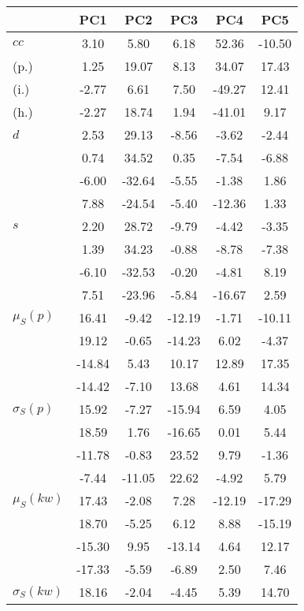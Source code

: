 \begin{table}[h!]
\begin{center}
\begin{tabular}{| l | c | c | c | c | c |}\hline
 & PC1 & PC2 & PC3 & PC4 & PC5 \\\hline
$cc$ & 3.10  & 5.80  & 6.18  & 52.36  & -10.50 \\\hline
(p.) & 1.25  & 19.07  & 8.13  & 34.07  & 17.43 \\\hline
(i.) & -2.77  & 6.61  & 7.50  & -49.27  & 12.41 \\\hline
(h.) & -2.27  & 18.74  & 1.94  & -41.01  & 9.17 \\\hline
$d$ & 2.53  & 29.13  & -8.56  & -3.62  & -2.44 \\\hline
 & 0.74  & 34.52  & 0.35  & -7.54  & -6.88 \\\hline
 & -6.00  & -32.64  & -5.55  & -1.38  & 1.86 \\\hline
 & 7.88  & -24.54  & -5.40  & -12.36  & 1.33 \\\hline
$s$ & 2.20  & 28.72  & -9.79  & -4.42  & -3.35 \\\hline
 & 1.39  & 34.23  & -0.88  & -8.78  & -7.38 \\\hline
 & -6.10  & -32.53  & -0.20  & -4.81  & 8.19 \\\hline
 & 7.51  & -23.96  & -5.84  & -16.67  & 2.59 \\\hline
$\mu_S(p)$ & 16.41  & -9.42  & -12.19  & -1.71  & -10.11 \\\hline
 & 19.12  & -0.65  & -14.23  & 6.02  & -4.37 \\\hline
 & -14.84  & 5.43  & 10.17  & 12.89  & 17.35 \\\hline
 & -14.42  & -7.10  & 13.68  & 4.61  & 14.34 \\\hline
$\sigma_S(p)$ & 15.92  & -7.27  & -15.94  & 6.59  & 4.05 \\\hline
 & 18.59  & 1.76  & -16.65  & 0.01  & 5.44 \\\hline
 & -11.78  & -0.83  & 23.52  & 9.79  & -1.36 \\\hline
 & -7.44  & -11.05  & 22.62  & -4.92  & 5.79 \\\hline
$\mu_S(kw)$ & 17.43  & -2.08  & 7.28  & -12.19  & -17.29 \\\hline
 & 18.70  & -5.25  & 6.12  & 8.88  & -15.19 \\\hline
 & -15.30  & 9.95  & -13.14  & 4.64  & 12.17 \\\hline
 & -17.33  & -5.59  & -6.89  & 2.50  & 7.46 \\\hline
$\sigma_S(kw)$ & 18.16  & -2.04  & -4.45  & 5.39  & 14.70 \\\hline

\end{tabular}
\end{center}
\end{table}
